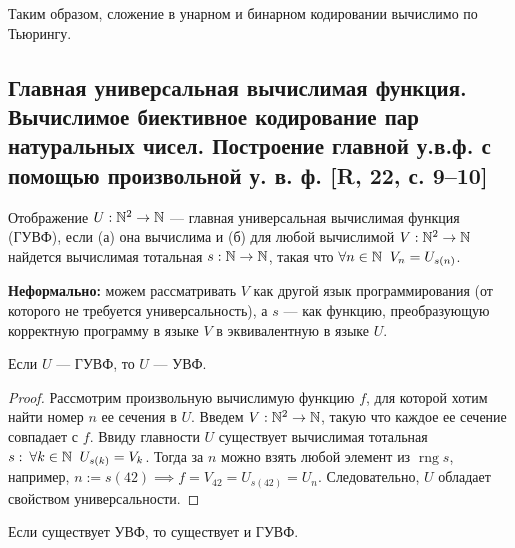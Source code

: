 \documentclass[a4paper, fleqn]{article}
\DeclareMathOperator{\rng}{\mathop{\mathrm{rng}}}
\begin{document}
        Таким образом, сложение в унарном и бинарном кодировании вычислимо по Тьюрингу.

    \subsection{Главная универсальная вычислимая функция. Вычислимое биективное кодирование пар натуральных чисел. Построение главной у.в.ф. с помощью произвольной у. в. ф. [R, 22, с. 9--10]}

        \begin{definition}
        Отображение $U : \mathbb{N}^2 \to \mathbb{N}$ --- главная универсальная вычислимая функция (ГУВФ), если (а) она вычислима и (б) для любой вычислимой $V : \mathbb{N}^2 \to \mathbb{N}$ найдется вычислимая тотальная $s : \mathbb{N} \to \mathbb{N}$, такая что $\forall n \in \mathbb{N} \;\; V_n = U_{s(n)}$.
        \end{definition}

        \textbf{Неформально:} можем рассматривать $V$ как другой язык программирования (от которого не требуется универсальность), а $s$ --- как функцию, преобразующую корректную программу в языке $V$ в эквивалентную в языке $U$.

        \begin{proposition}
            Если $U$ --- ГУВФ, то $U$ --- УВФ.
        \end{proposition}

        \begin{proof}
            Рассмотрим произвольную вычислимую функцию $f$, для которой хотим найти номер $n$ ее сечения в $U$. Введем $V : \mathbb{N}^2 \to \mathbb{N}$, такую что каждое ее сечение совпадает с $f$. Ввиду главности $U$ существует вычислимая тотальная $s: \: \forall k \in \mathbb{N} \;\; U_{s(k)} = V_k$. Тогда за $n$ можно взять любой элемент из $\rng s$, например, $n := s(42) \implies f = V_{42} = U_{s(42)} = U_n$. Следовательно, $U$ обладает свойством универсальности.
        \end{proof}

        \begin{proposition}
        Если существует УВФ, то существует и ГУВФ.
        \end{proposition}
\end{document}

